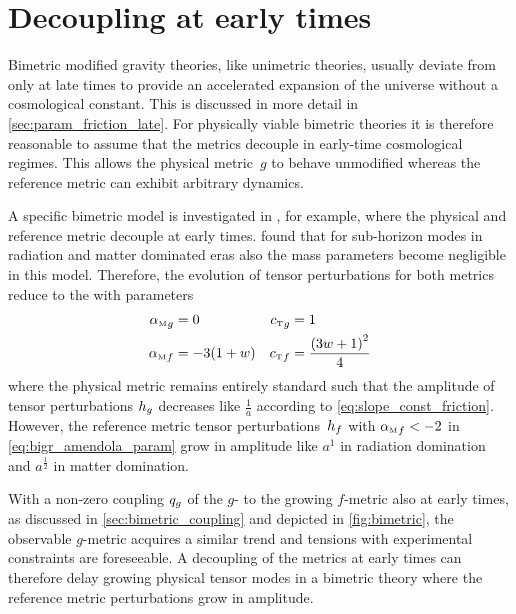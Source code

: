 

\section{Decoupling at early times}

Bimetric modified gravity theories, like unimetric theories, usually deviate from \LCDM{} only at late times to provide an accelerated expansion of the universe without a cosmological constant. This is discussed in more detail in \autoref{sec:param_friction_late}. For physically viable bimetric theories it is therefore reasonable to assume that the metrics decouple in early-time cosmological regimes. This allows the physical metric~\(g\) to behave unmodified whereas the reference metric can exhibit arbitrary dynamics.

A specific bimetric model is investigated in \autocite{Amendola2015}, for example, where the physical and reference metric decouple at early times. \Textcite{Amendola2015} found that for sub-horizon modes in radiation and matter dominated eras also the mass parameters become negligible in this model. Therefore, the evolution of tensor perturbations for both metrics reduce to the  with parameters \autocite{Amendola2015}
\begin{subequations}
\begin{align}
	\alphaMofmetr{g} &= 0 & \cTofmetr{g} &= 1 \\
	\alphaMofmetr{f} &= -3(1+\eosp) & \cTofmetr{f} &= \frac{\del{3\eosp + 1}^2}{4} \label{eq:bigr_amendola_param}
\end{align}
\end{subequations}
where the physical metric remains entirely standard such that the amplitude of tensor perturbations \(h_{g}\) decreases like \(\frac{1}{a}\) according to \eqref{eq:slope_const_friction}. However, the reference metric tensor perturbations~\(h_{f}\) with \({\alpha_{\textnormal{\tiny{M}}}}_{f}<-2\) in \eqref{eq:bigr_amendola_param} grow in amplitude like \(a^1\) in radiation domination and \(a^\frac{1}{2}\) in matter domination.

With a non-zero coupling \(q_{g}\) of the \(g\)- to the growing \(f\)-metric also at early times, as discussed in \autoref{sec:bimetric_coupling} and depicted in \autoref{fig:bimetric}, the observable \(g\)-metric acquires a similar trend and tensions with experimental constraints are foreseeable. A decoupling of the metrics at early times can therefore delay growing physical tensor modes in a bimetric theory where the reference metric perturbations grow in amplitude.



